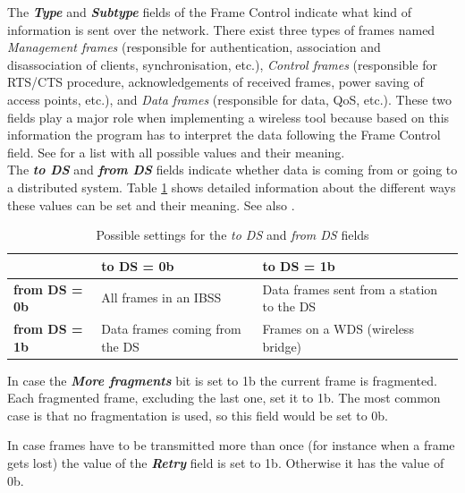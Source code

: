The {\bf{\em Type}} and {\bf{\em Subtype}} fields of the Frame Control indicate what kind of information is sent over the network. There exist three types of frames named {\em Management frames} (responsible for authentication, association and disassociation of clients, synchronisation, etc.), {\em Control frames} (responsible for RTS/CTS procedure, acknowledgements of received frames, power saving of access points, etc.), and {\em Data frames} (responsible for data, QoS, etc.). These two fields play a major role when implementing a wireless tool because based on this information the program has to interpret the data following the Frame Control field. See \cite[p.36]{80211standard} for a list with all possible values and their meaning. \\

The {\bf{\em to DS}} and {\bf{\em from DS}} fields indicate whether data is coming from or going to a distributed system. Table \ref{tofromDS} shows detailed information about the different ways these values can be set and their meaning. See also \cite[p.49]{80211wireless}.

\begin{table}[htbp]
	\begin{center}
		\vspace{1.5em}
		\begin{tabular}{l|p{100pt}|p{100pt}}
		&\bf{to DS = 0b}&\bf{to DS = 1b}\\
		\hline
		\bf{from DS = 0b}&All frames in an IBSS&Data frames sent from a station
			to the DS\\
		\hline
		\bf{from DS = 1b}&Data frames coming from the DS&Frames on a WDS
			(wireless bridge)\\
		\end{tabular}
	\end{center}
	\caption{Possible settings for the {\em to DS} and {\em from DS} fields}
	\vspace{1.5em}
	\label{tofromDS}
\end{table}

In case the {\bf{\em More fragments}} bit is set to 1b the current frame is fragmented. Each fragmented frame, excluding the last one, set it to 1b. The most common case is that no fragmentation is used, so this field would be set to 0b.

In case frames have to be transmitted more than once (for instance when a frame gets lost) the value of the {\bf{\em Retry}} field is set to 1b. Otherwise it has the value of 0b.

